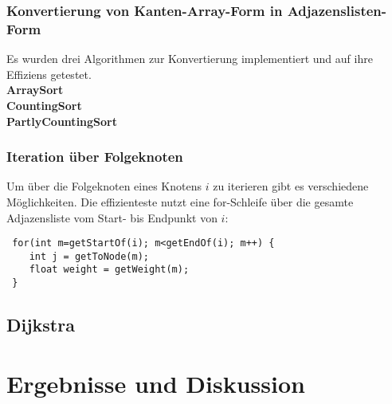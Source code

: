 \documentclass[a4paper,10pt]{article}
\begin{document}
\subsubsection{Konvertierung von Kanten-Array-Form in Adjazenslisten-Form}
Es wurden drei Algorithmen zur Konvertierung implementiert und auf ihre Effiziens getestet.\\
\textbf{ArraySort}\\
\textbf{CountingSort}\\
\textbf{PartlyCountingSort}\\

\subsubsection{Iteration über Folgeknoten}
Um über die Folgeknoten eines Knotens $i$ zu iterieren gibt es verschiedene Möglichkeiten. Die effizienteste nutzt eine for-Schleife über die gesamte Adjazensliste vom Start- bis Endpunkt von $i$:
\begin{lstlisting}
 for(int m=getStartOf(i); m<getEndOf(i); m++) {
    int j = getToNode(m);
    float weight = getWeight(m);
 }
\end{lstlisting}

\subsection{Dijkstra}


\section{Ergebnisse und Diskussion}
\end{document}
